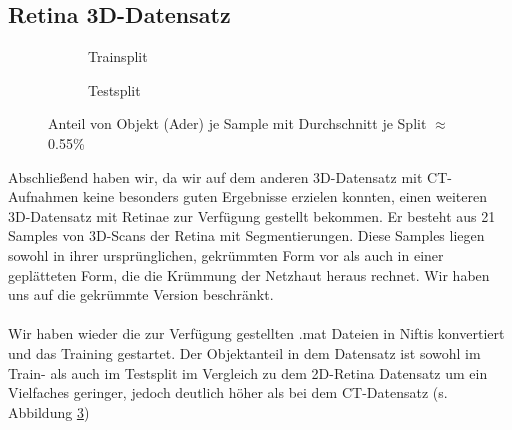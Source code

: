 \subsection{Retina 3D-Datensatz}
\begin{figure}[H]
\begin{minipage}{.5\textwidth}
\begin{subfigure}{\textwidth}

\caption{Trainsplit}
\label{pic:Haeuf-Train_108}
\end{subfigure}
\end{minipage}
\begin{minipage}{.5\textwidth}
\begin{subfigure}{\textwidth}

\caption{Testsplit}
\label{pic:Haeuf-Test_108}
\end{subfigure}
\end{minipage}
\caption{Anteil von Objekt (Ader) je Sample mit Durchschnitt je Split $\approx$ 0.55\%}
\label{pic:Haeuf_108}
\end{figure}
Abschließend haben wir, da wir auf dem anderen 3D-Datensatz mit CT-Aufnahmen keine besonders guten Ergebnisse erzielen konnten, einen weiteren 3D-Datensatz mit Retinae zur Verfügung gestellt bekommen. Er besteht aus 21 Samples von 3D-Scans der Retina mit Segmentierungen. Diese Samples liegen sowohl in ihrer ursprünglichen, gekrümmten Form vor als auch in einer geplätteten Form, die die Krümmung der Netzhaut heraus rechnet. Wir haben uns auf die gekrümmte Version beschränkt.\\\\
Wir haben wieder die zur Verfügung gestellten .mat Dateien in Niftis konvertiert \cite{autoMLGithub} und das Training gestartet. Der Objektanteil in dem Datensatz ist sowohl im Train- als auch im Testsplit im Vergleich zu dem 2D-Retina Datensatz \cite{retina2d} um ein Vielfaches geringer, jedoch deutlich höher als bei dem CT-Datensatz (s. Abbildung \ref{pic:Haeuf_108})
